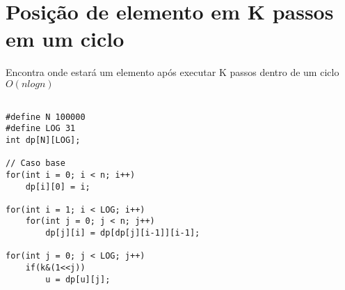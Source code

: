 \section{Posição de elemento em K passos em um ciclo}

Encontra onde estará um elemento após executar K passos dentro de um ciclo $O(n log n)$

\begin{multicols}{2}
	\begin{lstlisting}
	
#define N 100000
#define LOG 31
int dp[N][LOG];

// Caso base
for(int i = 0; i < n; i++)
	dp[i][0] = i;

for(int i = 1; i < LOG; i++)
	for(int j = 0; j < n; j++)
		dp[j][i] = dp[dp[j][i-1]][i-1];
		
for(int j = 0; j < LOG; j++)
	if(k&(1<<j))
		u = dp[u][j]; 
\end{lstlisting}
\end{multicols}
